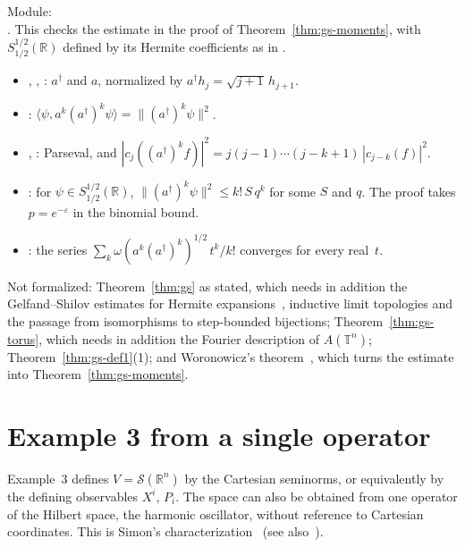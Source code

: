 \documentclass[11pt]{article}
\theoremstyle{definition}
\begin{document}
Module:\\ . This checks the estimate
in the proof of Theorem~\ref{thm:gs-moments}, with $S^{1/2}_{1/2}(\mathbb R)$ defined by its
Hermite coefficients as in .
\begin{itemize}
  \item {}, , : $a^\dagger$ and
    $a$, normalized by $a^\dagger h_j = \sqrt{j+1}\,h_{j+1}$.
  \item {}:
    $\langle\psi, a^k(a^\dagger)^k\psi\rangle = \|(a^\dagger)^k\psi\|^2$.
  \item {}, : Parseval, and
    $|c_j((a^\dagger)^k f)|^2 = j(j-1)\cdots(j-k+1)\,|c_{j-k}(f)|^2$.
  \item {}: for $\psi \in S^{1/2}_{1/2}(\mathbb R)$,
    $\|(a^\dagger)^k\psi\|^2 \le k!\,S\,q^k$ for some $S$ and $q$. The proof takes
    $p = e^{-\varepsilon}$ in the binomial bound.
  \item {}: the series
    $\sum_k \omega(a^k(a^\dagger)^k)^{1/2}\,t^k/k!$ converges for every real~$t$.
\end{itemize}
Not formalized: Theorem~\ref{thm:gs} as stated, which needs in addition the Gelfand--Shilov
estimates for Hermite expansions~\cite{gpr, lcp}, inductive limit topologies and the
passage from isomorphisms to step-bounded bijections;
Theorem~\ref{thm:gs-torus}, which needs in addition the Fourier description of $A(\mathbb T^n)$;
Theorem~\ref{thm:gs-def1}(1); and Woronowicz's theorem~\cite{woronowicz70}, which turns the
estimate into Theorem~\ref{thm:gs-moments}.

\section{Example 3 from a single operator}
\label{sec:oscillator}

Example~3 defines $V = \mathcal S(\mathbb R^n)$ by the Cartesian seminorms, or equivalently by
the defining observables $X^i$, $P_i$. The space can also be obtained from one operator of the
Hilbert space, the harmonic oscillator, without reference to Cartesian coordinates. This is
Simon's characterization~\cite{simon} (see also~\cite[Sec.~V.3]{reedsimon}).
\end{document}
